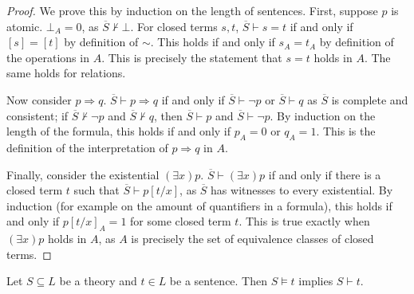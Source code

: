 \begin{proof}
    We prove this by induction on the length of sentences.
    First, suppose \( p \) is atomic.
    \( \bot_A = 0 \), as \( \overline S \not\vdash \bot \).
    For closed terms \( s, t \), \( \overline S \vdash s = t \) if and only if \( [s] = [t] \) by definition of \( \sim \).
    This holds if and only if \( s_A = t_A \) by definition of the operations in \( A \).
    This is precisely the statement that \( s = t \) holds in \( A \).
    The same holds for relations.

    Now consider \( p \Rightarrow q \).
    \( \overline S \vdash p \Rightarrow q \) if and only if \( \overline S \vdash \neg p \) or \( \overline S \vdash q \) as \( \overline S \) is complete and consistent; if \( \overline S \not\vdash \neg p \) and \( \overline S \not\vdash q \), then \( \overline S \vdash p \) and \( \overline S \vdash \neg p \).
    By induction on the length of the formula, this holds if and only if \( p_A = 0 \) or \( q_A = 1 \).
    This is the definition of the interpretation of \( p \Rightarrow q \) in \( A \).

    Finally, consider the existential \( (\exists x)p \).
    \( \overline S \vdash (\exists x)p \) if and only if there is a closed term \( t \) such that \( \overline S \vdash p[t/x] \), as \( \overline S \) has witnesses to every existential.
    By induction (for example on the amount of quantifiers in a formula), this holds if and only if \( p[t/x]_A = 1 \) for some closed term \( t \).
    This is true exactly when \( (\exists x)p \) holds in \( A \), as \( A \) is precisely the set of equivalence classes of closed terms.
\end{proof}
\begin{corollary}[adequacy]
    Let \( S \subseteq L \) be a theory and \( t \in L \) be a sentence.
    Then \( S \models t \) implies \( S \vdash t \).
\end{corollary}

